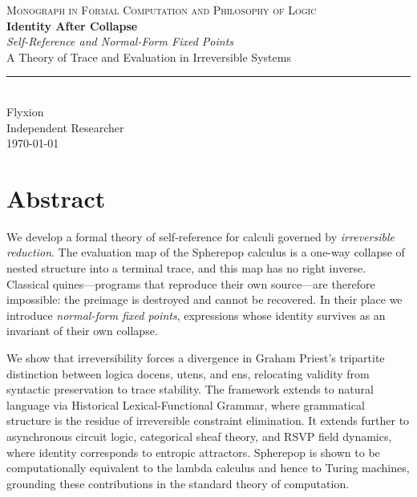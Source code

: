 \documentclass[12pt, oneside]{amsbook}
\theoremstyle{plain}
\theoremstyle{definition}
\theoremstyle{remark}
\begin{document}
\setcounter{secnumdepth}{0}   %
\setcounter{tocdepth}{2}       %


\begin{titlepage}
  \centering
  \vspace*{2cm}
  {\Large\textcolor{spgray}{\textsc{Monograph in Formal Computation and Philosophy of Logic}}}
  \\[1.8cm]
  {\Huge\bfseries\color{spblue} Identity After Collapse}\\[0.6cm]
{\Large\itshape Self-Reference and Normal-Form Fixed Points}\\[0.5cm]
{\normalsize\textcolor{spgray}{A Theory of Trace and Evaluation in Irreversible Systems}}\\[2.5cm]
\textcolor{spgray!60}{\rule{9cm}{0.4pt}}\\[1.2cm]
{\large Flyxion}\\[0.4cm]
  {\normalsize\textcolor{spgray}{Independent Researcher}}\\[2cm]
  {\normalsize\textcolor{spgray}{\today}}
  \vfill
\end{titlepage}

\cleardoublepage
\chapter*{Abstract}

We develop a formal theory of self-reference for calculi governed by
\emph{irreversible reduction}. The evaluation map of the Spherepop calculus
is a one-way collapse of nested structure into a terminal trace, and this map
has no right inverse. Classical quines---programs that reproduce their own
source---are therefore impossible: the preimage is destroyed and cannot be
recovered. In their place we introduce \emph{normal-form fixed points},
expressions whose identity survives as an invariant of their own collapse.

We show that irreversibility forces a divergence in Graham Priest's tripartite
distinction between logica docens, utens, and ens, relocating validity from
syntactic preservation to trace stability. The framework extends to natural
language via Historical Lexical-Functional Grammar, where grammatical structure
is the residue of irreversible constraint elimination. It extends further to
asynchronous circuit logic, categorical sheaf theory, and RSVP field dynamics,
where identity corresponds to entropic attractors. Spherepop is shown to be
computationally equivalent to the lambda calculus and hence to Turing machines,
grounding these contributions in the standard theory of computation.
\end{document}
